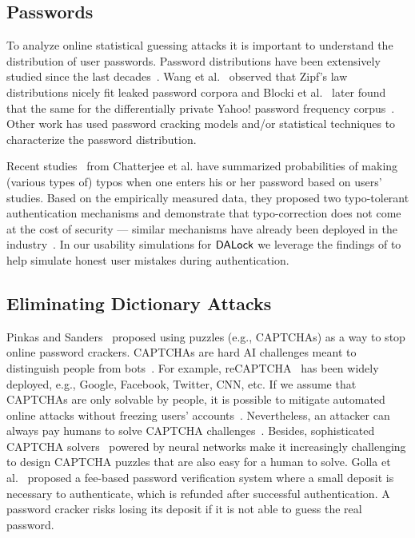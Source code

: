 \subsection{Passwords} \label{related: Passwords}  
\vspace*{-\baselineskip}
 To analyze online statistical guessing attacks it is important {to understand} the distribution of user passwords. Password distributions have been extensively studied since the last decades~\cite{SP:Bonneau12,FloHer:WWW07,DavKev:WWW12}. Wang et al.~\cite{EPRINT:WJHW14,TIFS17:WCWPXG,ESORICS:WanWan16} observed that Zipf's law distributions nicely fit leaked password corpora  and Blocki et al.~\cite{SP:BloHarZho18} later found that the same for the differentially private Yahoo! password frequency corpus~\cite{SP:Bonneau12,NDSS:BloDatBon16}. Other work has used password cracking models and/or statistical techniques to characterize the password distribution. 

  Recent studies~\cite{CCS:CWPCR17,SP:CAAJR16} from Chatterjee et al. have summarized probabilities of making (various types of) typos when one enters his or her password based on users' studies. Based on the empirically measured data, they proposed two typo-tolerant authentication {mechanisms and demonstrate that typo-correction does not come at the cost of security ---} similar mechanisms have already been deployed in the industry~\cite{News:AmazonTypo}.     {In our usability simulations for $\mathsf{DALock}$ we leverage the findings of \cite{CCS:CWPCR17,SP:CAAJR16}  to help simulate honest user mistakes during authentication. }


\vspace*{-\baselineskip}
\vspace*{-\baselineskip}
\subsection{Eliminating Dictionary Attacks} 
\vspace*{-\baselineskip}
 Pinkas and Sanders~\cite{CCS:PinSan02} proposed using puzzles (e.g., CAPTCHAs) as a way to stop online password crackers. CAPTCHAs are hard AI challenges meant to distinguish people from bots~\cite{EC:vBHL03}. For example, reCAPTCHA~\cite{von2008recaptcha} has been widely deployed, e.g., Google, Facebook, Twitter, CNN, etc. If we assume that CAPTCHAs are only solvable by people, it is possible to mitigate automated online attacks without freezing users' accounts~\cite{SP:BBFNJ10,CCS:BurMarMit11}. Nevertheless, an attacker can always pay humans to solve CAPTCHA challenges~\cite{captchaSolver}. Besides, sophisticated CAPTCHA solvers~\cite{CCS:YTFZFX18} powered by neural networks make it increasingly challenging to design CAPTCHA puzzles that are also easy for a human to solve.  Golla et al.~\cite{SOUPS:GBD17} proposed a fee-based password verification system where a small deposit is necessary to authenticate, which is refunded after successful authentication. A password cracker risks losing its deposit if it is not able to guess the real password.  

